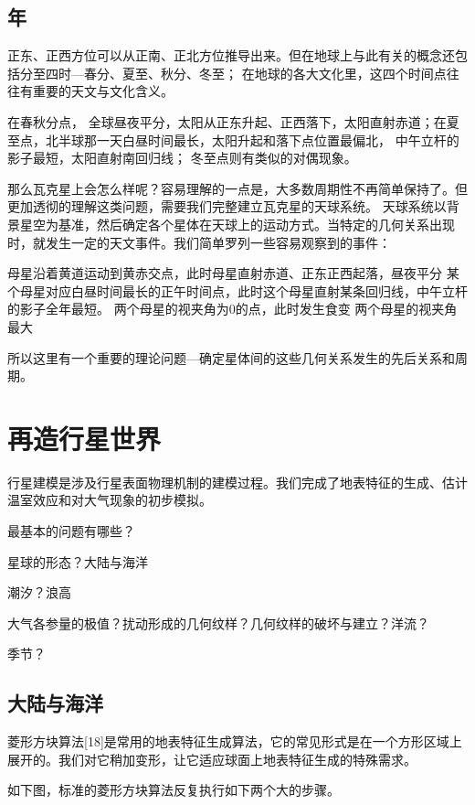 \documentclass[a4paper,10.5pt]{book}
\begin{document}
\section{年}

正东、正西方位可以从正南、正北方位推导出来。但在地球上与此有关的概念还包括分至四时—春分、夏至、秋分、冬至；
在地球的各大文化里，这四个时间点往往有重要的天文与文化含义。

在春秋分点， 全球昼夜平分，太阳从正东升起、正西落下，太阳直射赤道；在夏至点，北半球那一天白昼时间最长，太阳升起和落下点位置最偏北，
中午立杆的影子最短，太阳直射南回归线； 冬至点则有类似的对偶现象。

那么瓦克星上会怎么样呢？容易理解的一点是，大多数周期性不再简单保持了。但更加透彻的理解这类问题，需要我们完整建立瓦克星的天球系统。
天球系统以背景星空为基准，然后确定各个星体在天球上的运动方式。当特定的几何关系出现时，就发生一定的天文事件。我们简单罗列一些容易观察到的事件：

母星沿着黄道运动到黄赤交点，此时母星直射赤道、正东正西起落，昼夜平分
某个母星对应白昼时间最长的正午时间点，此时这个母星直射某条回归线，中午立杆的影子全年最短。
两个母星的视夹角为0的点，此时发生食变
两个母星的视夹角最大

所以这里有一个重要的理论问题—确定星体间的这些几何关系发生的先后关系和周期。




\chapter{再造行星世界}

行星建模是涉及行星表面物理机制的建模过程。我们完成了地表特征的生成、估计温室效应和对大气现象的初步模拟。

最基本的问题有哪些？

星球的形态？大陆与海洋

潮汐？浪高

大气各参量的极值？扰动形成的几何纹样？几何纹样的破坏与建立？洋流？

季节？

\section{大陆与海洋}

菱形方块算法[18]是常用的地表特征生成算法，它的常见形式是在一个方形区域上展开的。我们对它稍加变形，让它适应球面上地表特征生成的特殊需求。

如下图，标准的菱形方块算法反复执行如下两个大的步骤。
\end{document}
